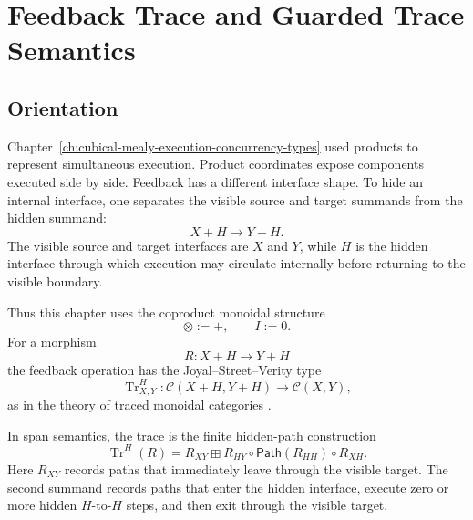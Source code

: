 \chapter{Feedback Trace and Guarded Trace Semantics}
\label{ch:feedback-trace}

\section{Orientation}
\label{sec:feedback-trace-orientation}

Chapter~\ref{ch:cubical-mealy-execution-concurrency-types} used products to represent
simultaneous execution. Product coordinates expose components executed side by
side. Feedback has a different interface shape. To hide an internal interface,
one separates the visible source and target summands from the hidden summand:
\[
  X+H \longrightarrow Y+H .
\]
The visible source and target interfaces are \(X\) and \(Y\), while \(H\) is
the hidden interface through which execution may circulate internally before
returning to the visible boundary.

Thus this chapter uses the coproduct monoidal structure
\[
  \otimes := +,
  \qquad
  I:=0.
\]
For a morphism
\[
  R:X+H\to Y+H
\]
the feedback operation has the Joyal--Street--Verity type
\[
  \operatorname{Tr}^{H}_{X,Y}:
  \mathcal C(X+H,Y+H)
  \longrightarrow
  \mathcal C(X,Y),
\]
as in the theory of traced monoidal categories
\cite{JoyalStreetVerity1996TracedMonoidalCategories}.

In span semantics, the trace is the finite hidden-path construction
\[
  \operatorname{Tr}^{H}(R)
  =
  R_{XY}
  \boxplus
  R_{HY}\circ
  \mathsf{Path}(R_{HH})
  \circ
  R_{XH}.
\]
Here \(R_{XY}\) records paths that immediately leave through the visible
target. The second summand records paths that enter the hidden interface,
execute zero or more hidden \(H\)-to-\(H\) steps, and then exit through the
visible target.

